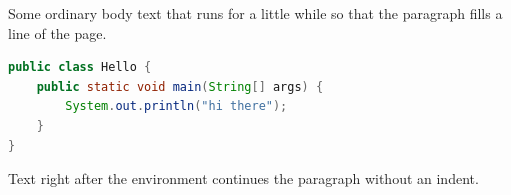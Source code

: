 \documentclass{article}
\begin{document}
Some ordinary body text that runs for a little while so that the paragraph fills a line of the page.
\begin{lstlisting}[language=Java]
public class Hello {
    public static void main(String[] args) {
        System.out.println("hi there");
    }
}
\end{lstlisting}
Text right after the environment continues the paragraph without an indent.
\end{document}
